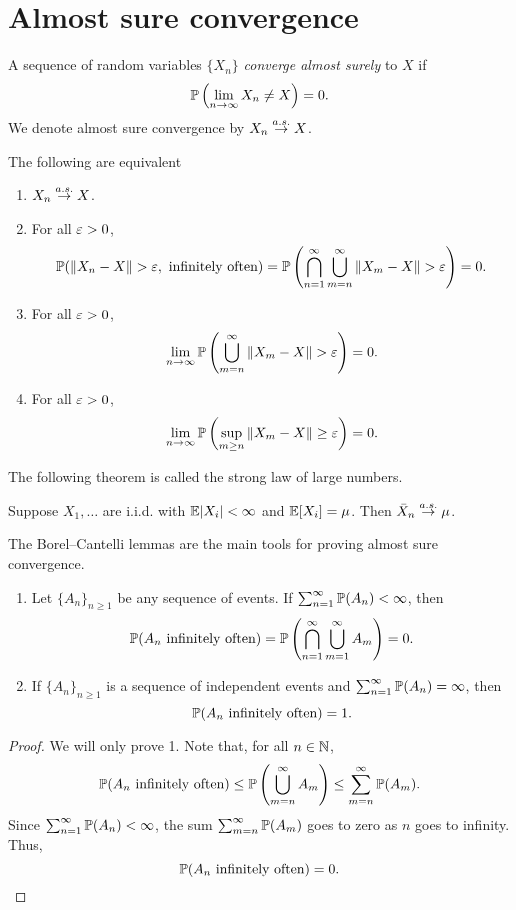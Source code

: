 \section{Almost sure convergence}
\begin{definition}
    A sequence of random variables $\{X_n\}$ \emph{converge almost surely} to $X$ if 
    \[{\mathbb{P}}\left(\lim_{n \to \infty}X_n \neq X\right) =0. \]
    We denote almost sure convergence by $X_n \stackrel{a.s.}{\to} X$.
\end{definition}
The following are equivalent
\begin{enumerate}
    \item $X_n \stackrel{a.s.}{\to} X$.
    \item For all $\varepsilon > 0$, \[\Pa(\norm{X_n-X}>\eps, \text{ infinitely often})=\Pa\left(\bigcap_{n=1}^\infty \bigcup_{m=n}^\infty \norm{X_m-X} > \eps \right)=0.\]
    \item For all $\varepsilon > 0$, \[\lim\limits_{n \to \infty} {\mathbb{P}}\left(\bigcup_{m=n}^\infty \left\|X_m -X\right\| > \varepsilon\right) = 0.\]
    \item For all $\varepsilon > 0$,
    \[\lim_{n \to \infty}{\mathbb{P}}\left(
    \sup_{m \ge n} \left\|X_m-X\right\| \ge \varepsilon\right) = 0.\]
\end{enumerate}
The following theorem is called the strong law of large numbers.
\begin{theorem}
    Suppose $X_1,\ldots$ are i.i.d. with ${\mathbb{E}}{\left\lvert X_i\right\rvert} < \infty $ and ${\mathbb{E}}[X_i] = \mu$. Then $\bar{X}_n \stackrel{a.s.}{\to} \mu$.
\end{theorem}
The Borel--Cantelli lemmas are the main tools for proving almost sure convergence.
\begin{proposition}
    \begin{enumerate}
        \item Let $\{A_n\}_{n \ge 1}$ be any sequence of events. If $\sum_{n=1}^\infty {\mathbb{P}}(A_n) < \infty$, then 
        \[{\mathbb{P}}(A_n \text{ infinitely often}) = {\mathbb{P}}\left(\bigcap_{n=1}^\infty \bigcup_{m=1}^\infty A_m\right)=0.\]
        \item If $\{A_n\}_{n \ge 1}$ is a sequence of independent events and $\sum_{n=1}^\infty {\mathbb{P}}(A_n) = \infty$, then
        \[{\mathbb{P}}(A_n \text{ infinitely often}) = 1.\]
    \end{enumerate}
\end{proposition}
\begin{proof}
    We will only prove 1. Note that, for all $n \in {{\mathbb N}}$,
    \[{\mathbb{P}}(A_n \text{ infinitely often}) \le {\mathbb{P}}\left(\bigcup_{m=n}^\infty A_m\right)\le \sum_{m=n}^\infty {\mathbb{P}}(A_m).\]
    Since $\sum_{n=1}^\infty {\mathbb{P}}(A_n) < \infty$, the sum $\sum_{m=n}^\infty {\mathbb{P}}(A_m)$ goes to zero as $n$ goes to infinity. Thus, \[{\mathbb{P}}(A_n \text{ infinitely often}) = 0. \qedhere\]
\end{proof}
